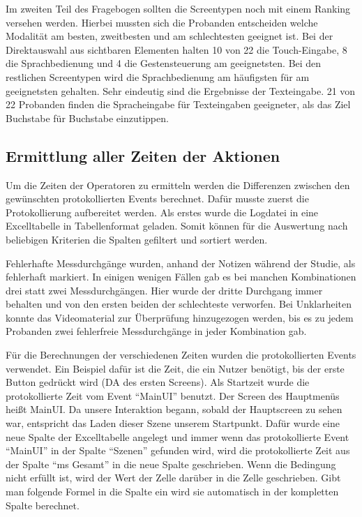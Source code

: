 Im zweiten Teil des Fragebogen sollten die Screentypen noch mit einem Ranking versehen werden. 
Hierbei mussten sich die Probanden entscheiden welche Modalität am besten, zweitbesten und am schlechtesten geeignet ist. 
Bei der Direktauswahl aus sichtbaren Elementen halten 10 von 22 die Touch-Eingabe, 8 die Sprachbedienung und 4 die Gestensteuerung am geeignetsten. 
Bei den restlichen Screentypen wird die Sprachbedienung am häufigsten für am geeignetsten gehalten. 
Sehr eindeutig sind die Ergebnisse der Texteingabe. 
21 von 22 Probanden finden die Spracheingabe für Texteingaben geeigneter, als das Ziel Buchstabe für Buchstabe einzutippen.

\subsection[Ermittlung der Zeiten der Aktionen]{Ermittlung aller Zeiten der Aktionen}
Um die Zeiten der Operatoren zu ermitteln werden die Differenzen zwischen den gewünschten protokollierten Events berechnet. 
Dafür musste zuerst die Protokollierung aufbereitet werden. 
Als erstes wurde die Logdatei in eine Excelltabelle in Tabellenformat geladen. 
Somit können für die Auswertung nach beliebigen Kriterien die Spalten gefiltert und sortiert werden. 

Fehlerhafte Messdurchgänge wurden, anhand der Notizen während der Studie, als fehlerhaft markiert. 
In einigen wenigen Fällen gab es bei manchen Kombinationen drei statt zwei Messdurchgängen. 
Hier wurde der dritte Durchgang immer behalten und von den ersten beiden der schlechteste verworfen. 
Bei Unklarheiten konnte das Videomaterial zur Überprüfung hinzugezogen werden, bis es zu jedem Probanden zwei fehlerfreie Messdurchgänge in jeder Kombination gab. 

Für die Berechnungen der verschiedenen Zeiten wurden die protokollierten Events verwendet. 
Ein Beispiel dafür ist die Zeit, die ein Nutzer benötigt, bis der erste Button gedrückt wird (DA des ersten Screens).
Als Startzeit wurde die protokollierte Zeit vom Event "`MainUI"' benutzt. 
Der Screen des Hauptmenüs heißt MainUI.
Da unsere Interaktion begann, sobald der Hauptscreen zu sehen war, entspricht das Laden dieser Szene unserem Startpunkt. 
Dafür wurde eine neue Spalte der Excelltabelle angelegt und immer wenn das protokollierte Event "`MainUI"' in der Spalte "`Szenen"' gefunden wird, wird die protokollierte Zeit aus der Spalte "`ms Gesamt"' in die neue Spalte geschrieben. 
Wenn die Bedingung nicht erfüllt ist, wird der Wert der Zelle darüber in die Zelle geschrieben. 
Gibt man folgende Formel in die Spalte ein wird sie automatisch in der kompletten Spalte berechnet.  

